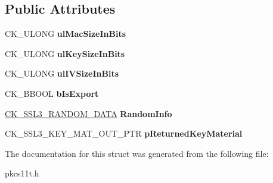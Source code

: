 \subsection*{Public Attributes}
\begin{DoxyCompactItemize}
\item 
\mbox{\label{struct_c_k___s_s_l3___k_e_y___m_a_t___p_a_r_a_m_s_a02e30c07929506f8a878a24349d99066}} 
C\+K\+\_\+\+U\+L\+O\+NG {\bfseries ul\+Mac\+Size\+In\+Bits}
\item 
\mbox{\label{struct_c_k___s_s_l3___k_e_y___m_a_t___p_a_r_a_m_s_ad2e5b76a9c770b3e55c931ea0bf0cf6a}} 
C\+K\+\_\+\+U\+L\+O\+NG {\bfseries ul\+Key\+Size\+In\+Bits}
\item 
\mbox{\label{struct_c_k___s_s_l3___k_e_y___m_a_t___p_a_r_a_m_s_a273e058984b05fe492b6d61aa9c663f9}} 
C\+K\+\_\+\+U\+L\+O\+NG {\bfseries ul\+I\+V\+Size\+In\+Bits}
\item 
\mbox{\label{struct_c_k___s_s_l3___k_e_y___m_a_t___p_a_r_a_m_s_ae3d9c8286def8fa37af7a192a7cb0c72}} 
C\+K\+\_\+\+B\+B\+O\+OL {\bfseries b\+Is\+Export}
\item 
\mbox{\label{struct_c_k___s_s_l3___k_e_y___m_a_t___p_a_r_a_m_s_a7387cc6814e33f415c8d8911c180e1b3}} 
\hyperlink{struct_c_k___s_s_l3___r_a_n_d_o_m___d_a_t_a}{C\+K\+\_\+\+S\+S\+L3\+\_\+\+R\+A\+N\+D\+O\+M\+\_\+\+D\+A\+TA} {\bfseries Random\+Info}
\item 
\mbox{\label{struct_c_k___s_s_l3___k_e_y___m_a_t___p_a_r_a_m_s_ae594680757bfb006a92c466af54ae88a}} 
C\+K\+\_\+\+S\+S\+L3\+\_\+\+K\+E\+Y\+\_\+\+M\+A\+T\+\_\+\+O\+U\+T\+\_\+\+P\+TR {\bfseries p\+Returned\+Key\+Material}
\end{DoxyCompactItemize}


The documentation for this struct was generated from the following file\+:\begin{DoxyCompactItemize}
\item 
pkcs11t.\+h\end{DoxyCompactItemize}
